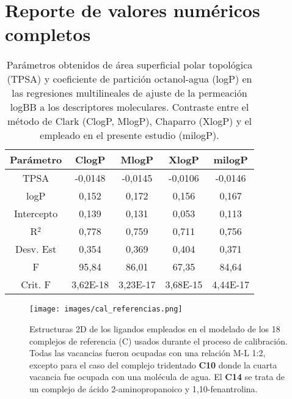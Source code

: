 \chapter{Reporte de valores numéricos completos}\label{ap2}

\begin{table}[h]
\centering
\caption{Parámetros obtenidos de área superficial polar topológica (TPSA) y coeficiente de partición octanol-agua (logP) en las regresiones multilineales de ajuste de la permeación logBB a los descriptores moleculares. Contraste entre el método de Clark (ClogP, MlogP), Chaparro (XlogP) y el empleado en el presente estudio (milogP).}
\begin{tabular}{ccccc}
\hline
\textbf{Parámetro} & \textbf{ClogP} & \textbf{MlogP} & \textbf{XlogP} & \textbf{milogP} \\ \hline
TPSA               & -0,0148          & -0,0145          & -0,0106         & -0,0146          \\
logP              & 0,152            & 0,172            & 0,156           & 0,167            \\
Intercepto         & 0,139            & 0,131            & 0,053           & 0,113            \\
R$^{2}$                 & 0,778            & 0,759            & 0,711           & 0,756            \\
Desv. Est          & 0,354            & 0,369            & 0,404           & 0,371            \\
F                  & 95,84            & 86,01            & 67,35           & 84,64            \\
Crit. F            & 3,62E-18         & 3,23E-17         & 3,68E-15        & 4,44E-17         \\ \hline
\end{tabular}
\end{table}

\clearpage

\hspace{0cm}
\vfill
\begin{figure}[ht] 
\centering
\texttt{[image: images/cal\_referencias.png]}
\caption{Estructuras 2D de los ligandos empleados en el modelado de los 18 complejos de referencia (C) usados durante el proceso de calibración. Todas las vacancias fueron ocupadas con una relación M-L 1:2, excepto para el caso del complejo tridentado \textbf{C10} donde la cuarta vacancia fue ocupada con una molécula de agua. El \textbf{C14} se trata de un complejo de ácido 2-aminopropanoico y 1,10-fenantrolina.}
\label{cal_referencias}
\end{figure}
\vfill
\hspace{0cm}

